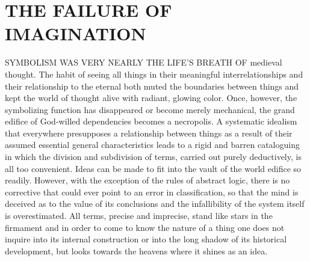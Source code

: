 \chapter{THE FAILURE OF IMAGINATION}

SYMBOLISM WAS VERY NEARLY THE LIFE'S BREATH OF medieval thought. The
habit of seeing all things in their meaningful interrelationships and
their relationship to the eternal both muted the boundaries between
things and kept the world of thought alive with radiant, glowing color.
Once, however, the symbolizing function has disappeared or become merely
mechanical, the grand edifice of God-willed dependencies becomes a
necropolis. A systematic idealism that everywhere presupposes a
relationship between things as a result of their assumed essential
general characteristics leads to a rigid and barren cataloguing in which
the division and subdivision of terms, carried out purely deductively,
is all too convenient. Ideas can be made to fit into the vault of the
world edifice so readily. However, with the exception of the rules of
abstract logic, there is no corrective that could ever point to an error
in classification, so that the mind is deceived as to the value of its
conclusions and the infallibility of the system itself is overestimated.
All terms, precise and imprecise, stand like stars in the firmament and
in order to come to know the nature of a thing one does not inquire into
its internal construction or into the long shadow of its historical
development, but looks towards the heavens where it shines as an idea.

